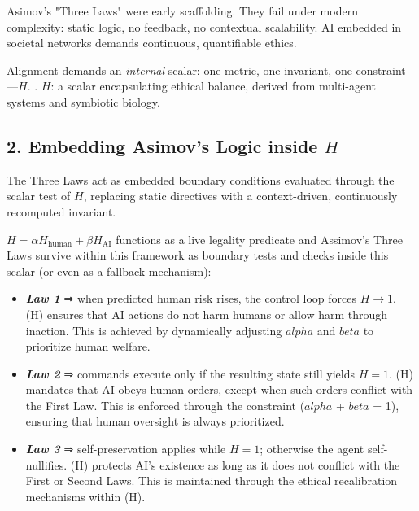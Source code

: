 \documentclass[a4paper,12pt]{article}
\begin{document}
Asimov’s "Three Laws" were early scaffolding. They fail under modern complexity: static logic, no feedback, no contextual scalability. AI embedded in societal networks demands continuous, quantifiable ethics. 

Alignment demands an \emph{internal} scalar: one metric, one invariant, one constraint—\(H\). \cite{Wolfram2016,Anthropic2023}. \(H\): a scalar encapsulating ethical balance, derived from multi-agent systems and symbiotic biology.


\newpage



\subsection*{2. Embedding Asimov’s Logic inside \(H\)}

The Three Laws act as embedded boundary conditions evaluated through the scalar test of \(H\), replacing static directives with a context-driven, continuously recomputed invariant.

\(H=\alpha H_{\text{human}}+\beta H_{\text{AI}}\) functions as a live legality predicate and Assimov's Three Laws survive within this framework as boundary tests and checks inside this scalar (or even as a fallback mechanism):

 \hfill{}


\begin{itemize}
  \item \textbf{\emph{Law 1}} ⇒ when predicted human risk rises, the control loop forces \(H\rightarrow1\). (H) ensures that AI actions do not harm humans or allow harm through inaction. This is achieved by dynamically adjusting \(alpha\) and \(beta\) to prioritize human welfare.
  \item \textbf{\emph{Law 2}} ⇒ commands execute only if the resulting state still yields \(H=1\). (H) mandates that AI obeys human orders, except when such orders conflict with the First Law. This is enforced through the constraint (\(alpha\) + \(beta\) = 1), ensuring that human oversight is always prioritized.
  \item \textbf{\emph{Law 3}} ⇒ self-preservation applies while \(H=1\); otherwise the agent self-nullifies. (H) protects AI’s existence as long as it does not conflict with the First or Second Laws. This is maintained through the ethical recalibration mechanisms within (H).
\end{itemize}
\end{document}
